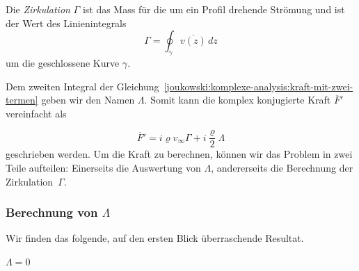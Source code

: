 \begin{definition}[Zirkulation]
	\label{joukowski:komplexe-analysis:def:zirkulation}
	Die \emph{Zirkulation} $\Gamma$ ist das Mass für die um ein Profil drehende Strömung 
%
	und ist der Wert des Linienintegrals
	\[
		\Gamma
		=
		\oint_{\gamma} \overline{v(z)}
		\, dz
	\]
	um die geschlossene Kurve $\gamma$.
\end{definition}

Dem zweiten Integral der Gleichung~\eqref{joukowski:komplexe-analysis:kraft-mit-zwei-termen} geben wir den Namen $\Lambda$.
Somit kann die komplex konjugierte Kraft $\overline{F}'$ vereinfacht als

\begin{equation}
	\overline{F}'
	=
	i \varrho v_\infty \Gamma + i \frac{\varrho}{2} \Lambda
	\label{joukowski:komplexe-analysis:kraft-mit-lambda}
\end{equation}
geschrieben werden.
Um die Kraft zu berechnen, können wir das Problem in zwei Teile aufteilen:
Einerseits die Auswertung von $\Lambda$,
andererseits die Berechnung der Zirkulation~$\Gamma$.

\subsubsection{Berechnung von $\Lambda$}
\label{joukowski:komplexe-analysis:berechnung-von-lambda}
Wir finden das folgende, auf den ersten Blick überraschende Resultat.

\begin{satz}
	$\Lambda = 0$
	\label{joukowski:komplexe-analysis:satz:Lambda}
\end{satz}

